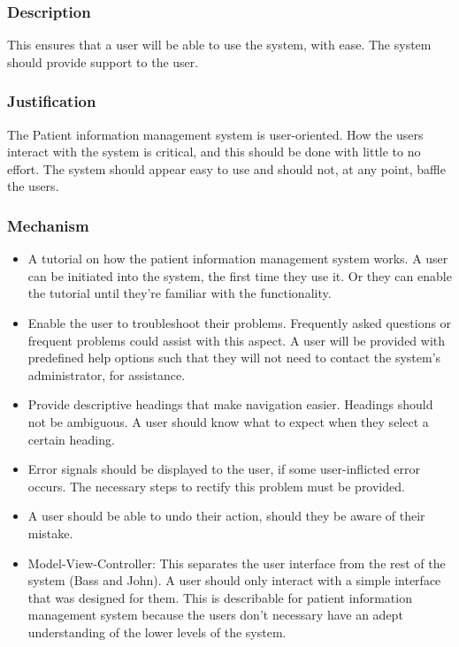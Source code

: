 \subsubsection*{Description}
This ensures that a user will be able to use the system, with ease. The system should provide support to the user.
\subsubsection*{Justification}
The Patient information management system is user-oriented. How the users interact with the system is critical, and this should be done with little to no effort. The system should appear easy to use and should not, at any point, baffle the users. 
\subsubsection*{Mechanism}		
		 \begin{itemize}
		 	\item A tutorial on how the patient information management system works. A user can be initiated into the system, the first time they use it. Or they can enable the tutorial until they're familiar with the functionality.
		 	\item Enable the user to troubleshoot their problems. Frequently asked questions or frequent problems could assist with this aspect.  A user will be provided with predefined help options such that they will not need to contact the system's administrator, for assistance.
		 	\item Provide descriptive headings that make navigation easier. Headings should not be ambiguous. A user should know what to expect when they select a certain heading.
		 	\item Error signals should be displayed to the user, if some user-inflicted error occurs. The necessary steps to rectify this problem must be provided.
		 	\item A user should be able to undo their action, should they be aware of their mistake.
			\item Model-View-Controller: This separates the user interface from the rest of the system (Bass and John). A user should only interact with a simple interface that was designed for them. This is describable for patient information management system because the users don't necessary have an adept understanding of the lower   levels of the system.
		\end{itemize}